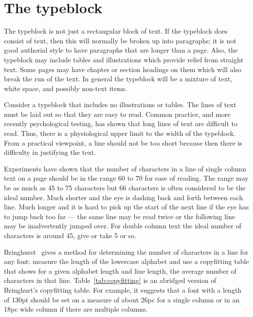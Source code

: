 \documentclass[10pt,a4paper,extrafontsizes]{memoir}
\begin{document}
\section{The typeblock} \label{sec:tblock}

\begin{paracol}{2}
\switchEng
    The typeblock is not just a rectangular block of text. If the typeblock
does consist of text, then this will normally be broken up into 
paragraphs; it is not good authorial style to have 
paragraphs that are longer than a page. Also, the typeblock may include 
tables and illustrations which provide 
relief from straight text. Some pages may have chapter or section 
headings on them which
will also break the run of the text. In general the typeblock will
be a mixture of text, white space, and possibly non-text items.

    Consider a typeblock that includes no illustrations 
or tables.
The lines of text must be laid out so that they are easy to read.
Common practice, and more recently psychological testing, has shown that
long lines of text are difficult to read. Thus, there is a physiological
upper limit to the width of the typeblock. From a practical viewpoint,
a line should not be too short because then there is difficulty in justifying
the text.

    Experiments have shown that the number of characters in a line of
single column text on a page should be
in the range 60 to 70 for ease of reading. The range may be as much
as 45 to 75 characters but 66 characters is often
considered to be the ideal number. Much shorter and the eye is dashing
back and forth between each line. Much longer and it is hard to pick up the
start of the next line if the eye has to jump back too far --- the same line
may be read twice or the following line may be inadvertently jumped over.
For double column text the ideal number of characters 
is around 45, give or take 5 or so.

    Bringhurst~\autocite{BRINGHURST99} gives a 
method for determining the number
of characters in a line for any font: 
measure the length of the lowercase alphabet and use a 
copyfitting 
table that shows for a given alphabet 
length and line length, the average number of characters in that line.
 Table~\ref{tab:copyfitting} is an
abridged version of Bringhurt's copyfitting table.
For example, it suggests that a font with a length of 130pt should be
set on a measure of about 26pc for a single column 
or in an 18pc wide column if there are multiple 
columns.
\end{paracol} 
\end{document}
